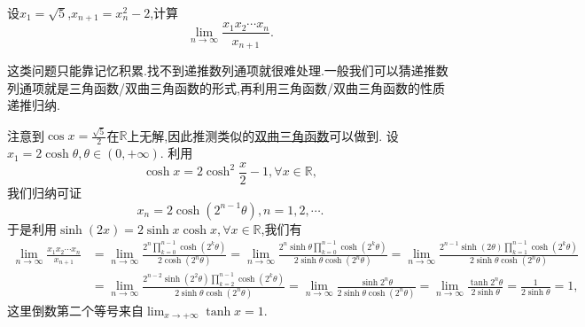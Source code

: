 \documentclass[../../main.tex]{subfiles}%
\begin{document}
\begin{example}
设\(x_1 = \sqrt{5}\),\(x_{n + 1}=x_{n}^{2}-2\),计算
\[
\lim_{n\rightarrow\infty}\frac{x_1x_2\cdots x_n}{x_{n + 1}}.
\]
\end{example}
\begin{note}
这类问题只能靠记忆积累.找不到递推数列通项就很难处理.一般我们可以猜递推数列通项就是三角函数/双曲三角函数的形式,再利用三角函数/双曲三角函数的性质递推归纳.
\end{note}
\begin{solution}
注意到\(\cos x=\frac{\sqrt{5}}{2}\)在\(\mathbb{R}\)上无解,因此推测类似的\href{https://baike.baidu.com/item/%E5%8F%8C%E6%9B%B2%E5%87%BD%E6%95%B0/8704306}{双曲三角函数}可以做到.
设\(x_1 = 2\cosh\theta,\theta\in(0,+\infty)\). 利用
\[
\cosh x=2\cosh^{2}\frac{x}{2}-1,\forall x\in\mathbb{R},
\]
我们归纳可证
\[
x_n=2\cosh(2^{n - 1}\theta),n = 1,2,\cdots.
\]
于是利用\(\sinh(2x)=2\sinh x\cosh x,\forall x\in\mathbb{R}\),我们有
\begin{align*}
\lim_{n\rightarrow\infty}\frac{x_1x_2\cdots x_n}{x_{n + 1}}&=\lim_{n\rightarrow\infty}\frac{2^{n}\prod\limits_{k = 0}^{n - 1}\cosh(2^{k}\theta)}{2\cosh(2^{n}\theta)}=\lim_{n\rightarrow\infty}\frac{2^{n}\sinh\theta\prod\limits_{k = 0}^{n - 1}\cosh(2^{k}\theta)}{2\sinh\theta\cosh(2^{n}\theta)}=\lim_{n\rightarrow\infty}\frac{2^{n - 1}\sinh(2\theta)\prod\limits_{k = 1}^{n - 1}\cosh(2^{k}\theta)}{2\sinh\theta\cosh(2^{n}\theta)}\\
&=\lim_{n\rightarrow\infty}\frac{2^{n - 2}\sinh(2^{2}\theta)\prod\limits_{k = 2}^{n - 1}\cosh(2^{k}\theta)}{2\sinh\theta\cosh(2^{n}\theta)}=\lim_{n\rightarrow\infty}\frac{\sinh2^{n}\theta}{2\sinh\theta\cosh(2^{n}\theta)}=\lim_{n\rightarrow\infty}\frac{\tanh2^{n}\theta}{2\sinh\theta}=\frac{1}{2\sinh\theta}=1,
\end{align*}
这里倒数第二个等号来自\(\lim_{x\rightarrow+\infty}\tanh x = 1\).

\end{solution}
\end{document}
